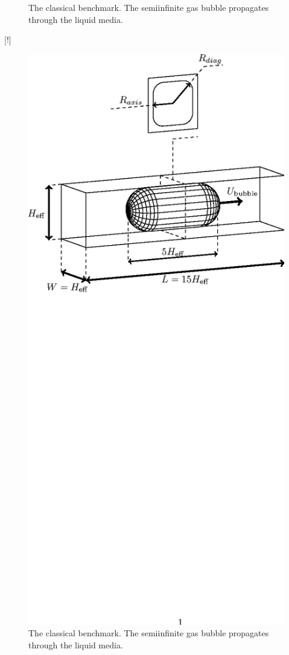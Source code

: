 \documentclass{article}
\begin{document}
\begin{figure}[!]
\caption{The classical benchmark. The semiinfinite gas bubble
propagates through the liquid media. \label{fig:classical:benchmark}}
\end{figure}[!]
\begin{figure}
\includegraphics*[bb=152 470 410 713,width=\textwidth]{Figures/benchmark_lbm.eps}
\caption{The classical benchmark. The semiinfinite gas bubble
propagates through the liquid media. \label{fig:lbm:benchmark}}
\end{figure}
\end{document}

